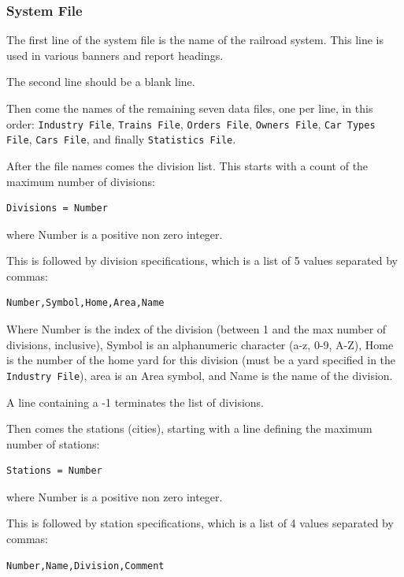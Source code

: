 \subsubsection{System File}

The first line of the system file is the name of the railroad system. 
This line is used in various banners and report headings.

The second line should be a blank line.

Then come the names of the remaining seven data files, one per line, in
this order: \verb=Industry File=, \verb=Trains File=, \verb=Orders File=, 
\verb=Owners File=, \verb=Car Types File=, \verb=Cars File=, and finally 
\verb=Statistics File=. 

After the file names comes the division list.  This starts with a count
of the maximum number of divisions:

\begin{verbatim}
Divisions = Number
\end{verbatim}

where Number is a positive non zero integer.

This is followed by division specifications, which is a list of 5 values
separated by commas:

\begin{verbatim}
Number,Symbol,Home,Area,Name
\end{verbatim}

Where Number is the index of the division (between 1 and the max number
of divisions, inclusive), Symbol is an alphanumeric character (a-z, 0-9,
A-Z), Home is the number of the home yard for this division (must be a
yard specified in the \verb=Industry File=), area is an Area symbol, and
Name is the name of the division.

A line containing a -1 terminates the list of divisions.

Then comes the stations (cities), starting with a line defining the maximum
number of stations:

\begin{verbatim}
Stations = Number
\end{verbatim}

where Number is a positive non zero integer.

This is followed by station specifications, which is a list of 4 values
separated by commas:

\begin{verbatim}
Number,Name,Division,Comment
\end{verbatim}

